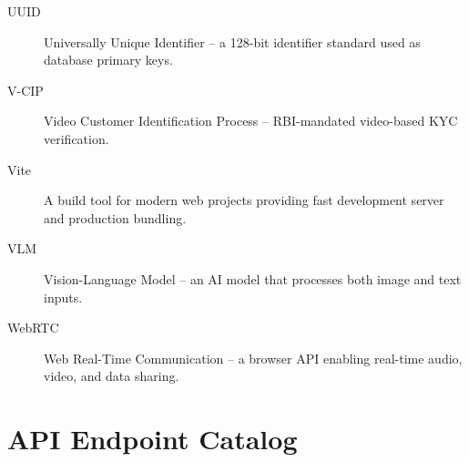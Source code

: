 \begin{description}
    \item[UUID] Universally Unique Identifier -- a 128-bit identifier standard used as database primary keys.
    \item[V-CIP] Video Customer Identification Process -- RBI-mandated video-based KYC verification.
    \item[Vite] A build tool for modern web projects providing fast development server and production bundling.
    \item[VLM] Vision-Language Model -- an AI model that processes both image and text inputs.
    \item[WebRTC] Web Real-Time Communication -- a browser API enabling real-time audio, video, and data sharing.
\end{description}

\appendix
\chapter{API Endpoint Catalog}

